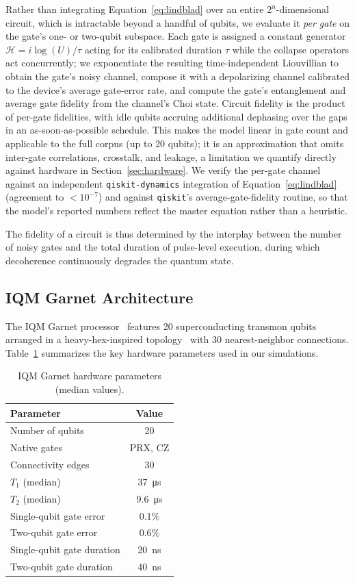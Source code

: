 \documentclass[sigconf,nonacm]{acmart}
\newcommand{\ham}{\mathcal{H}}
\begin{document}
Rather than integrating Equation~\ref{eq:lindblad} over an entire $2^n$-dimensional circuit, which is intractable beyond a handful of qubits, we evaluate it \emph{per gate} on the gate's one- or two-qubit subspace. Each gate is assigned a constant generator $\ham = i\log(U)/\tau$ acting for its calibrated duration $\tau$ while the collapse operators act concurrently; we exponentiate the resulting time-independent Liouvillian to obtain the gate's noisy channel, compose it with a depolarizing channel calibrated to the device's average gate-error rate, and compute the gate's entanglement and average gate fidelity from the channel's Choi state. Circuit fidelity is the product of per-gate fidelities, with idle qubits accruing additional dephasing over the gaps in an as-soon-as-possible schedule. This makes the model linear in gate count and applicable to the full corpus (up to 20 qubits); it is an approximation that omits inter-gate correlations, crosstalk, and leakage, a limitation we quantify directly against hardware in Section~\ref{sec:hardware}. We verify the per-gate channel against an independent \texttt{qiskit-dynamics} integration of Equation~\ref{eq:lindblad} (agreement to $<10^{-7}$) and against \texttt{qiskit}'s average-gate-fidelity routine, so that the model's reported numbers reflect the master equation rather than a heuristic.

The fidelity of a circuit is thus determined by the interplay between the number of noisy gates and the total duration of pulse-level execution, during which decoherence continuously degrades the quantum state.

\subsection{IQM Garnet Architecture}

The IQM Garnet processor~\cite{iqm2024garnet} features 20 superconducting transmon qubits arranged in a heavy-hex-inspired topology~\cite{chamberland2020heavy} with 30 nearest-neighbor connections. Table~\ref{tab:hardware} summarizes the key hardware parameters used in our simulations.

\begin{table}[t]
\centering
\caption{IQM Garnet hardware parameters (median values).}
\label{tab:hardware}
\begin{tabular}{lc}
\toprule
Parameter & Value \\
\midrule
Number of qubits & 20 \\
Native gates & PRX, CZ \\
Connectivity edges & 30 \\
$T_1$ (median) & \SI{37}{\micro\second} \\
$T_2$ (median) & \SI{9.6}{\micro\second} \\
Single-qubit gate error & 0.1\% \\
Two-qubit gate error & 0.6\% \\
Single-qubit gate duration & \SI{20}{\nano\second} \\
Two-qubit gate duration & \SI{40}{\nano\second} \\
\bottomrule
\end{tabular}
\end{table}
\end{document}
